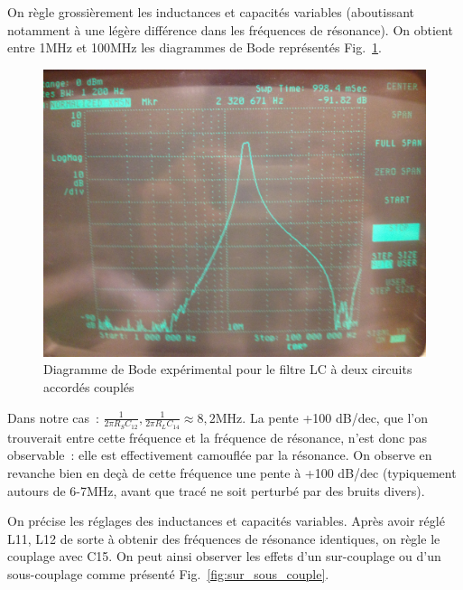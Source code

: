 \documentclass{article}
\begin{document}
On règle grossièrement les inductances et capacités variables (aboutissant notamment à une légère différence dans les fréquences de résonance). On obtient entre 1MHz et 100MHz les diagrammes de Bode représentés Fig.~\ref{fig:LC2plot}.

\begin{figure}[h]
	\centering
	\includegraphics[width=.5\textwidth]{1MHz_100MHz}
	\caption{Diagramme de Bode expérimental pour le filtre LC à deux circuits accordés couplés}
	\label{fig:LC2plot}
\end{figure}

Dans notre cas~: ${\frac{1}{2\pi R_S C_{12}}, \frac{1}{2\pi R_L C_{14}}\approx 8,2\mathrm{MHz}}$. La pente +100 dB/dec, que l'on trouverait entre cette fréquence et la fréquence de résonance, n'est donc pas observable~: elle est effectivement camouflée par la résonance. On observe en revanche bien en deçà de cette fréquence une pente à +100 dB/dec (typiquement autours de 6-7MHz, avant que tracé ne soit perturbé par des bruits divers).



On précise les réglages des inductances et capacités variables. Après avoir réglé L11, L12 de sorte à obtenir des fréquences de résonance identiques, on règle le couplage avec C15. On peut ainsi observer les effets d'un sur-couplage ou d'un sous-couplage comme présenté Fig.~\ref{fig:sur_sous_couple}.
\end{document}
